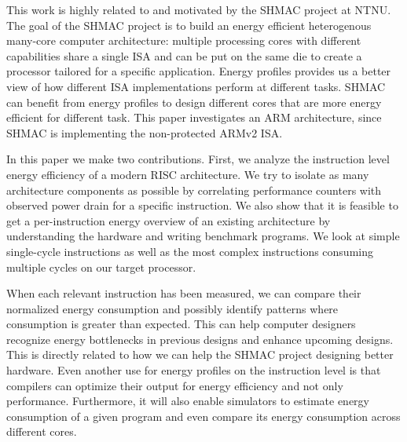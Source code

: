 This work is highly related to and motivated by the SHMAC
project\cite{Umuroglu662354}\cite{rusten2012implementing} at NTNU. The goal of
the SHMAC project is to build an energy efficient heterogenous many-core
computer architecture: multiple processing cores with different capabilities
share a single ISA and can be put on the same die to create a processor tailored
for a specific application. Energy profiles provides us a better view of how
different ISA implementations perform at different tasks\cite{kumar2003single}.
SHMAC can benefit from energy profiles to design different cores that are more
energy efficient for different task.  This paper investigates an ARM
architecture, since SHMAC is implementing the non-protected ARMv2 ISA.

In this paper we make two contributions. First, we analyze the instruction level
energy efficiency of a modern RISC architecture. We try to isolate as many
architecture components as possible by correlating performance counters with
observed power drain for a specific instruction. We also show that it is
feasible to get a per-instruction energy overview of an existing architecture by
understanding the hardware and writing benchmark programs. We look at simple
single-cycle instructions as well as the most complex instructions consuming
multiple cycles on our target processor.

When each relevant instruction has been measured, we can compare their
normalized energy consumption and possibly identify patterns where consumption
is greater than expected. This can help computer designers recognize energy
bottlenecks in previous designs and enhance upcoming designs. This is directly
related to how we can help the SHMAC project designing better hardware. Even
another use for energy profiles on the instruction level is that compilers can
optimize their output for energy efficiency and not only performance.
Furthermore, it will also enable simulators to estimate energy consumption of a
given program and even compare its energy consumption across different cores.



